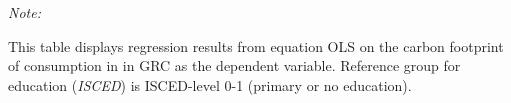 \begin{table}[htbp!]
\begin{adjustbox}{width = 1\textwidth, max height = 0.95\textheight, center}
\begin{threeparttable}[b]
         \begin{tablenotes}\item \medskip \textit{Note:}
            \item This table displays regression results from equation OLS on the carbon footprint of consumption in  in GRC as the dependent variable.  Reference group for education (\textit{ISCED}) is ISCED-level 0-1 (primary or no education).
         \end{tablenotes}
      \end{threeparttable}
   \end{adjustbox}
\end{table}


